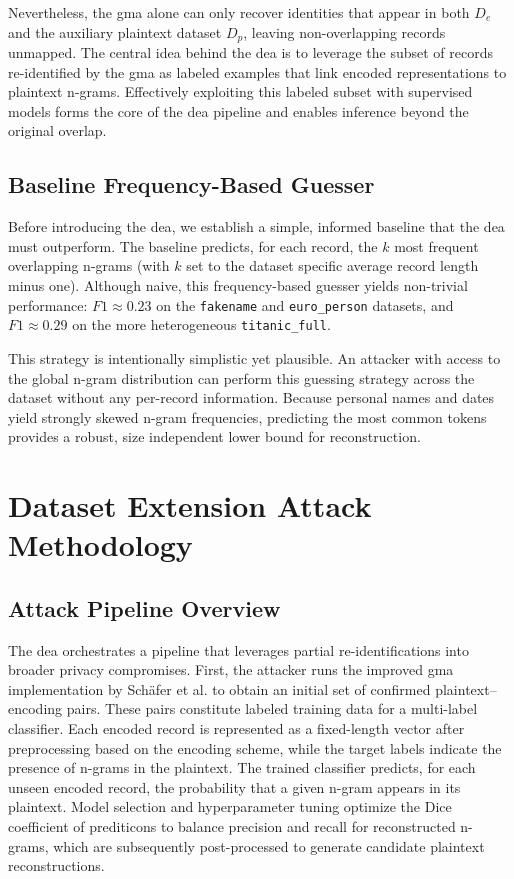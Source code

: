\documentclass[a4paper,11pt]{scrartcl}
\begin{document}
Nevertheless, the \ac{gma} alone can only recover identities that appear in both $D_e$ and the auxiliary plaintext dataset $D_p$, leaving non-overlapping records unmapped. 
The central idea behind the \ac{dea} is to leverage the subset of records re-identified by the \ac{gma} as labeled examples that link encoded representations to plaintext n-grams. 
Effectively exploiting this labeled subset with supervised models forms the core of the \ac{dea} pipeline and enables inference beyond the original overlap.

\subsection{Baseline Frequency-Based Guesser}
Before introducing the \ac{dea}, we establish a simple, informed baseline that the \ac{dea} must outperform. 
The baseline predicts, for each record, the $k$ most frequent overlapping n-grams (with $k$ set to the dataset specific average record length minus one). 
Although naive, this frequency-based guesser yields non-trivial performance: $F1 \approx 0.23$ on the \texttt{fakename} and \texttt{euro\_person} datasets, and $F1 \approx 0.29$ on the more heterogeneous \texttt{titanic\_full}.

This strategy is intentionally simplistic yet plausible. 
An attacker with access to the global n-gram distribution can perform this guessing strategy across the dataset without any per-record information. 
Because personal names and dates yield strongly skewed n-gram frequencies, predicting the most common tokens provides a robust, size independent lower bound for reconstruction.

\section{Dataset Extension Attack Methodology}

\subsection{Attack Pipeline Overview}
The \ac{dea} orchestrates a pipeline that leverages partial re-identifications into broader privacy compromises. 
First, the attacker runs the improved \ac{gma} implementation by Schäfer et al. to obtain an initial set of confirmed plaintext–encoding pairs. 
These pairs constitute labeled training data for a multi-label classifier. 
Each encoded record is represented as a fixed-length vector after preprocessing based on the encoding scheme, while the target labels indicate the presence of n-grams in the plaintext. 
The trained classifier predicts, for each unseen encoded record, the probability that a given n-gram appears in its plaintext.
Model selection and hyperparameter tuning optimize the Dice coefficient of prediticons to balance precision and recall for reconstructed n-grams, which are subsequently post-processed to generate candidate plaintext reconstructions.
\end{document}
